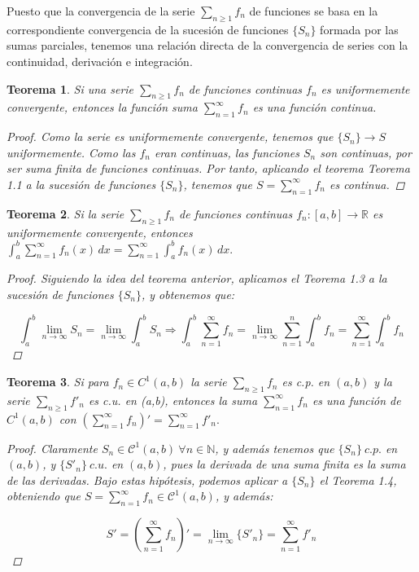 \documentclass[11pt, a4paper]{article}
\theoremstyle{theorem-style}
\newtheorem{nth}{Teorema}[section]
\theoremstyle{definition-style}
\theoremstyle{remark-style}
\theoremstyle{example-style}
\begin{document}
Puesto que  la convergencia de la serie $\sum_{n\geq 1} f_n$ de funciones se basa en la correspondiente convergencia de la sucesi\'on de funciones $\{S_n\}$ formada por las sumas parciales, tenemos una relación directa de la convergencia de series con la continuidad, derivación e integración.


\begin{nth}
Si una serie  $\sum_{n\geq 1} f_n $ de funciones continuas $f_n$ es uniformemente convergente, entonces la funci\'on suma $\displaystyle \sum_{n=1}^{\infty} f_n $ es una funci\'on continua.

\begin{proof}
Como la serie es uniformemente convergente, tenemos que $\{S_n\} \to S$ uniformemente. Como las $f_n$ eran continuas, las funciones $S_n$ son continuas, por ser suma finita de funciones continuas. Por tanto, aplicando el teorema \textit{Teorema 1.1} a la sucesión de funciones $\{S_n\}$, tenemos que $S = \sum_{n=1}^{\infty} f_n$ es continua.
\end{proof}
\end{nth}


\begin{nth}
Si la serie $\sum_{n\geq 1} f_n $ de funciones continuas $f_n:[a,b]\longrightarrow \mathbb R$ es uniformemente convergente, entonces 
$
\displaystyle \int_a^b \sum_{n=1}^{\infty} f_n (x) \, dx =  \sum_{n=1}^{\infty} \int_a^b f_n (x) \, dx  .
$

\begin{proof}
Siguiendo la idea del teorema anterior, aplicamos el \textit{Teorema 1.3} a la sucesión de funciones $\{S_n\}$, y obtenemos que:

$$\int_a^b \lim_{n \to \infty} S_n = \lim_{n \to \infty} \int_a^b S_n \Rightarrow \int_a^b \sum_{n=1}^{\infty} f_n = \lim_{n \to \infty} \sum_{n=1}^n \int_a^b f_n = \sum_{n =1}^{\infty} \int_a^b f_n$$
\end{proof}
\end{nth}


\begin{nth}
Si para $f_n\in C^1(a,b)$  la serie  $\sum_{n\geq 1} f_n $ es  c.p.  en $(a,b)$ y  la serie  $ \sum_{n\geq 1} f'_n $ es  c.u. en (a,b), entonces la suma $\displaystyle \sum_{n=1}^{\infty} f_n $ es una funci\'on de  $C^1(a,b)$ con 
$
\displaystyle \left( \sum_{n=1}^{\infty} f_n \right)' =  \sum_{n=1}^{\infty}  f'_n  .
$

\begin{proof}
Claramente $S_n \in \mathcal{C}^1(a,b)\ \forall n \in \mathbb{N}$, y además tenemos que $\{S_n\}\ c.p.$ en $(a,b)$, y $\{S'_n\}\ c.u.$ en $(a,b)$, pues la derivada de una suma finita es la suma de las derivadas. Bajo estas hipótesis, podemos aplicar a $\{S_n\}$ el \textit{Teorema 1.4}, obteniendo que $S = \sum_{n=1}^{\infty} f_n \in \mathcal{C}^1(a,b)$, y además:

$$S' = \left( \sum_{n=1}^{\infty} f_n \right)' = \lim_{n \to \infty} \{S'_n\} = \sum_{n=1}^{\infty} f'_n$$
\end{proof}
\end{nth}
\end{document}
